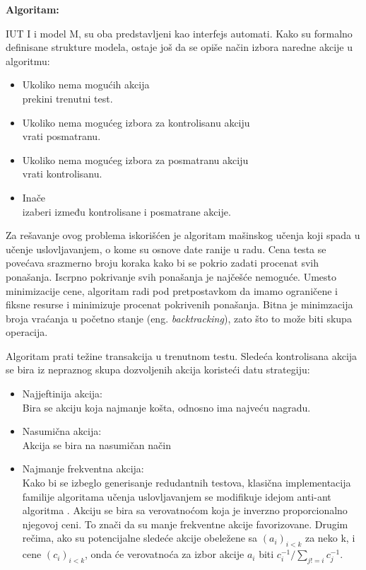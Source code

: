 \documentclass[a4paper]{article}
\theoremstyle{definition}
\begin{document}
{\noindent
\textbf{Algoritam:} 

IUT I i model M, su oba predstavljeni kao interfejs automati.
Kako su formalno definisane strukture modela, ostaje još da se opiše način izbora naredne akcije u algoritmu:
\begin{itemize}
\item Ukoliko nema mogućih akcija\\ prekini trenutni test. 
\item Ukoliko nema mogućeg izbora za kontrolisanu akciju\\ vrati posmatranu.
\item Ukoliko nema mogućeg izbora za posmatranu akciju\\ vrati kontrolisanu.
\item Inače\\ izaberi između kontrolisane i posmatrane akcije.
\end{itemize}

Za rešavanje ovog problema iskorišćen je algoritam mašinskog učenja koji spada u učenje uslovljavanjem, o kome su osnove date ranije u radu. 
Cena testa se povećava srazmerno broju koraka kako bi se pokrio zadati procenat svih ponašanja. Iscrpno pokrivanje svih ponašanja je najčešće nemoguće.
Umesto minimizacije cene, algoritam radi pod pretpostavkom da imamo ograničene i fiksne resurse i minimizuje procenat pokrivenih ponašanja. Bitna je minimzacija broja vraćanja u početno stanje  (eng. \emph{backtracking}), zato što to može biti skupa operacija.

Algoritam prati težine transakcija u trenutnom testu. Sledeća kontrolisana akcija se bira iz nepraznog skupa dozvoljenih akcija koristeći datu strategiju:
\begin{itemize}
\item Najjeftinija akcija: \\
Bira se akciju koja najmanje košta, odnosno ima najveću nagradu.

\item Nasumična akcija: \\
Akcija se bira na nasumičan način

\item Najmanje frekventna akcija: \\
Kako bi se izbeglo generisanje redudantnih testova, klasična implementacija familije algoritama učenja uslovljavanjem se modifikuje idejom anti-ant algoritma \cite{antiAnt}.
Akciju se bira sa verovatnoćom koja je inverzno proporcionalno njegovoj ceni. To znači da su manje frekventne akcije favorizovane.
Drugim rečima, ako su potencijalne sledeće akcije obeležene sa $(a_i)_{i < k}$ za neko k, i cene $(c_i)_{i < k}$, onda će verovatnoća za izbor akcije $a_i$ biti $c_i^{-1} / \sum_{j!=i}^{} c_j^{-1}$.
\end{itemize}

}
\end{document}
